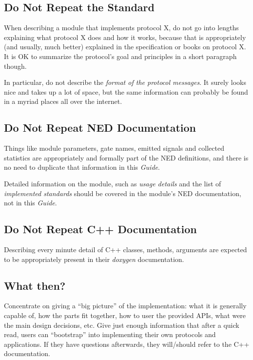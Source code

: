 \subsection{Do Not Repeat the Standard}

When describing a module that implements protocol X, do not go
into lengths explaining what protocol X does and how it works,
because that is appropriately (and usually, much better) explained 
in the specification or books on protocol X. It is OK to summarize
the protocol's goal and principles in a short paragraph though.

In particular, do not describe the \textit{format of the protocol messages}.
It surely looks nice and takes up a lot of space, but the same information
can probably be found in a myriad places all over the internet.

\subsection{Do Not Repeat NED Documentation}

Things like module parameters, gate names, emitted signals and collected 
statistics are appropriately and formally part of the NED definitions,
and there is no need to duplicate that information in this \textit{Guide}.

Detailed information on the module, such as \textit{usage details} and the 
list of \textit{implemented standards} should be covered in the module's 
NED documentation, not in this \textit{Guide}.

\subsection{Do Not Repeat C++ Documentation}

Describing every minute detail of C++ classes, methods, arguments are
expected to be appropriately present in their \textit{doxygen}
documentation.

\subsection{What then?}

Concentrate on giving a ``big picture'' of the implementation: what it
is generally capable of, how the parts fit together, how to user the
provided APIs, what were the main design decisions, etc. Give just
enough information that after a quick read, users can ``bootstrap''
into implementing their own protocols and applications. If they have
questions afterwards, they will/should refer to the C++ documentation.



